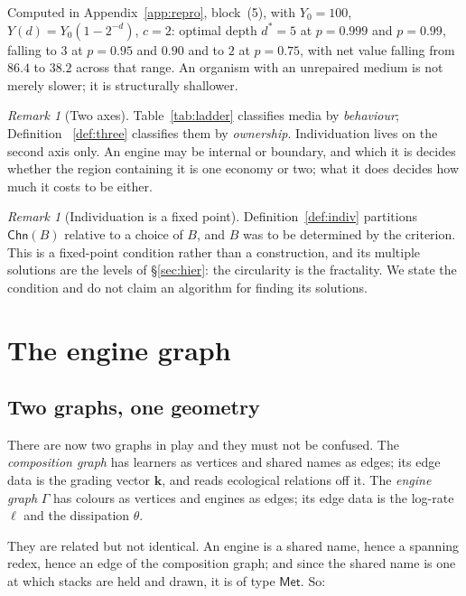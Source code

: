 \documentclass[11pt]{article}
\theoremstyle{plain}
\theoremstyle{definition}
\theoremstyle{remark}
\newtheorem{remark}[theorem]{Remark}
\newcommand{\Met}{\mathsf{Met}}
\newcommand{\Chn}{\mathsf{Chn}}
\begin{document}
Computed in Appendix~\ref{app:repro}, block~(5), with $Y_0 = 100$,
$Y(d) = Y_0(1-2^{-d})$, $c=2$: optimal depth $d^\ast = 5$ at $p = 0.999$
and $p=0.99$, falling to $3$ at $p = 0.95$ and $0.90$ and to $2$ at
$p = 0.75$, with net value falling from $86.4$ to $38.2$ across that range.
An organism with an unrepaired medium is not merely slower; it is
structurally shallower.

\begin{remark}[Two axes]
Table~\ref{tab:ladder} classifies media by \emph{behaviour}; Definition~
\ref{def:three} classifies them by \emph{ownership}. Individuation lives on
the second axis only. An engine may be internal or boundary, and which it
is decides whether the region containing it is one economy or two; what it
does decides how much it costs to be either.
\end{remark}

\begin{remark}[Individuation is a fixed point]\label{rem:fixpoint}
Definition~\ref{def:indiv} partitions $\Chn(B)$ relative to a choice of
$B$, and $B$ was to be determined by the criterion. This is a fixed-point
condition rather than a construction, and its multiple solutions are the
levels of \S\ref{sec:hier}: the circularity is the fractality. We state the
condition and do not claim an algorithm for finding its solutions.
\end{remark}

\section{The engine graph}
\label{sec:code}

\subsection{Two graphs, one geometry}

There are now two graphs in play and they must not be confused. The
\emph{composition graph} has learners as vertices and shared names as
edges; its edge data is the grading vector $\mathbf{k}$, and
\cite[\S5]{compose} reads ecological relations off it. The \emph{engine
graph} $\Gamma$ has colours as vertices and engines as edges; its edge data
is the log-rate $\ell$ and the dissipation $\theta$.

They are related but not identical. An engine is a shared name, hence a
spanning redex, hence an edge of the composition graph; and since the
shared name is one at which stacks are held and drawn, it is of type
$\Met$. So:
\end{document}
